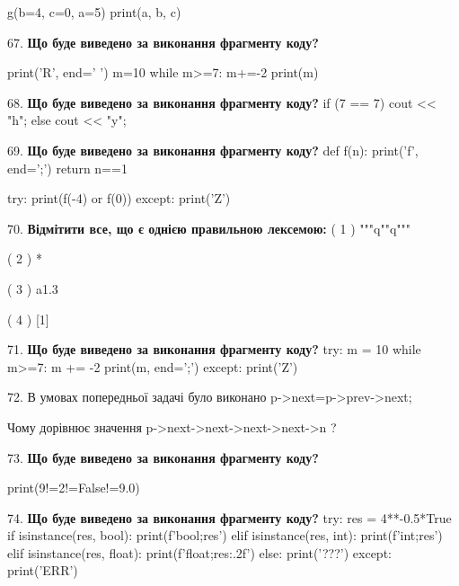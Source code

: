 \documentclass[11pt]{article}
\begin{document}
g(b=4, c=0, a=5)
print(a, b, c)
\par\vspace{5mm}

67. \textbf{Що буде виведено за виконання фрагменту коду?}

print('R', end=' ')
m=10
while m>=7:
    m+=-2
print(m)

\par\vspace{5mm}

68. \textbf{Що буде виведено за виконання фрагменту коду?}
if (7 == 7)
    cout << "h";
else
    cout << "y";

\par\vspace{5mm}

69. \textbf{Що буде виведено за виконання фрагменту коду?}
def f(n):
    print('f', end=';')
    return n==1

try:
    print(f(-4) or f(0))
except:
    print('Z')
\par\vspace{5mm}

70. %
\textbf{Відмітити все, що є однією правильною лексемою:}
( 1 ) """q""q"""

( 2 ) *

( 3 ) a1.3

( 4 ) [1]
\par\vspace{5mm}

71. \textbf{Що буде виведено за виконання фрагменту коду?}
try:
    m = 10
    while m>=7:
        m += -2
    print(m, end=';')
except:
    print('Z')
\par\vspace{5mm}

72. 
В умовах попередньої задачі було виконано p->next=p->prev->next;

Чому дорівнює значення p->next->next->next->next->n ?\par\vspace{5mm}

73. \textbf{Що буде виведено за виконання фрагменту коду?}

print(9!=2!=False!=9.0)
\par\vspace{5mm}

74. \textbf{Що буде виведено за виконання фрагменту коду?}
try:
    res = 4**-0.5*True
    if isinstance(res, bool):
        print(f'bool;{res}')
    elif isinstance(res, int):
        print(f'int;{res}')
    elif isinstance(res, float):
        print(f'float;{res:.2f}')
    else:
        print('???')
except:
    print('ERR')
\par\vspace{5mm}
\end{document}
